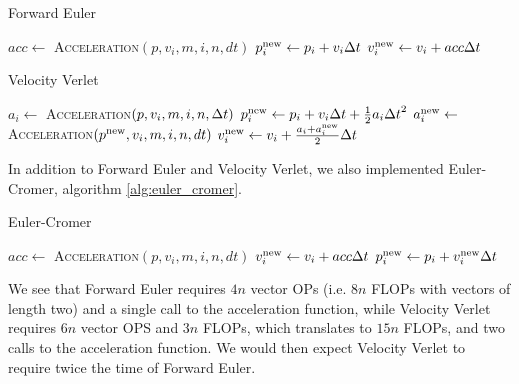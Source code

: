 \documentclass[a4paper]{article}
\begin{document}
\begin{algorithm}
\caption{Forward Euler} \label{alg:forward_euler}
\begin{algorithmic}[1]
        \State $acc \gets $ \textsc{Acceleration}$(p, v_{i}, m, i, n, dt)$
        \State $p^{\mathrm{new}}_{i} \gets p_{i} + v_{i} {\Delta t}$
        \State $v^{\mathrm{new}}_{i} \gets v_{i} + acc {\Delta t}$
    \EndFor
  \EndProcedure
\end{algorithmic}
\end{algorithm}

\begin{algorithm}
\caption{Velocity Verlet} \label{alg:velocity_verlet}
\begin{algorithmic}[1]
        \State $a_{i} \gets $ \textsc{Acceleration}$(p, v_{i}, m, i, n, {\Delta t})$
        \State $p^{\mathrm{new}}_{i} \gets p_{i} + v_{i} {\Delta t} + \frac{1}{2} a_{i} {\Delta t}^2$
    \EndFor
        \State $a^{\mathrm{new}}_{i} \gets $ \textsc{Acceleration}$(p^{\mathrm{new}}, v_{i}, m, i, n, dt)$
        \State $v^{\mathrm{new}}_{i} \gets v_{i} + \frac{a_{i} + a^{\mathrm{new}}_{i}}{2} {\Delta t}$
    \EndFor
  \EndProcedure
\end{algorithmic}
\end{algorithm}

In addition to Forward Euler and Velocity Verlet, we also implemented Euler-Cromer, algorithm \vref{alg:euler_cromer}.
\begin{algorithm}
\caption{Euler-Cromer} \label{alg:euler_cromer}
\begin{algorithmic}[1]
        \State $acc \gets $ \textsc{Acceleration}$(p, v_{i}, m, i, n, dt)$
        \State $v^{\mathrm{new}}_{i} \gets v_{i} + acc {\Delta t}$
        \State $p^{\mathrm{new}}_{i} \gets p_{i} + v^{\mathrm{new}}_{i} {\Delta t}$
    \EndFor
  \EndProcedure
\end{algorithmic}
\end{algorithm}

We see that Forward Euler requires $4n$ vector OPs (i.e. $8n$ FLOPs with vectors of length two) and a single call to the acceleration function, while Velocity Verlet requires $6n$ vector OPS and $3n$ FLOPs, which translates to $15n$ FLOPs, and two calls to the acceleration function. We would then expect Velocity Verlet to require twice the time of Forward Euler.
\end{document}
